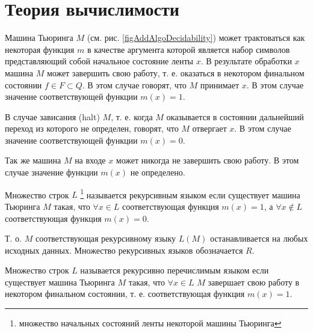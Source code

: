 \section{Теория вычислимости}

Машина Тьюринга $M$ (см. рис. \ref{figAddAlgoDecidability}) может
трактоваться как некоторая функция $m$ в качестве 
аргумента которой является набор символов представляющий собой
начальное состояние ленты $x$. В результате обработки $x$ машина $M$
может завершить свою работу, т. е. оказаться в некотором финальном
состоянии $f \in F \subset Q$. В этом случае говорят, что $M$
принимает $x$. В этом случае значение соответствующей функции 
$m(x) = 1$. 




В случае зависания (halt) $M$, т. е. когда $M$
оказывается в состоянии дальнейший переход из которого не определен,
говорят, что $M$ отвергает $x$. В этом случае значение соответствующей
функции $m(x) =0$. 

Так же машина $M$ на входе $x$ может никогда не
завершить свою работу. В этом случае значение функции $m(x)$
не определено.    

\begin{definition}
Множество строк $L$
\footnote{множество начальных состояний ленты некоторой
машины Тьюринга}
называется рекурсивным языком если существует машина Тьюринга $M$
такая, что $\forall x \in L$ соответствующая функция $m(x) = 1$, а 
$\forall x \notin L$ соответствующая функция $m(x) = 0$. 
\end{definition}

Т. о. $M$ соответствующая рекурсивному языку $L\left(M\right)$ 
останавливается на любых исходных данных. Множество рекурсивных языков
обозначается $R$.

\begin{definition} 
Множество строк $L$
называется рекурсивно перечислимым языком если существует машина Тьюринга $M$
такая, что $\forall x \in L$ $M$ завершает свою работу в некотором
финальном состоянии, т. е. соответствующая функция $m(x) = 1$. 
\end{definition}

